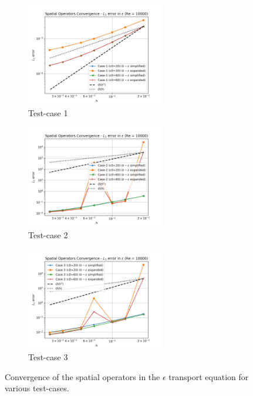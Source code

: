 \begin{figure}[H]
  \begin{subfigure}{7cm}
    \centering\includegraphics[width=6cm]{Code-Figures/keps/keps-op-conv/eps_conv_tc_1_re_10000.png}
    \caption{Test-case 1}
  \end{subfigure}
  \begin{subfigure}{7cm}
    \centering\includegraphics[width=6cm]{Code-Figures/keps/keps-op-conv/eps_conv_tc_2_re_10000.png}
    \caption{Test-case 2}
  \end{subfigure}
  \begin{subfigure}{7cm}
    \centering\includegraphics[width=6cm]{Code-Figures/keps/keps-op-conv/eps_conv_tc_3_re_10000.png}
    \caption{Test-case 3}
  \end{subfigure}
  \caption{Convergence of the spatial operators in the $\epsilon$ transport equation for various test-cases.}
  \label{fig:eps-spatial-ooc}
\end{figure}

